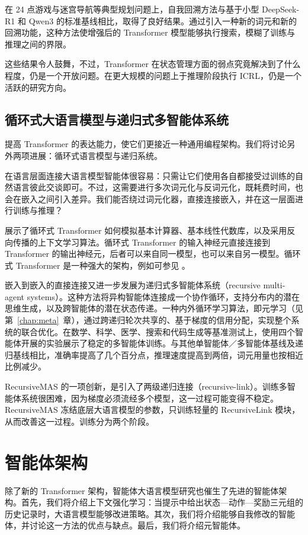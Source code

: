 在 24 点游戏与迷宫导航等典型规划问题上，自我回溯方法与基于小型 DeepSeek-R1 和 Qwen3 的标准基线相比，取得了良好结果。通过引入一种新的词元和新的回溯功能，这种方法使增强后的 Transformer 模型能够执行搜索，模糊了训练与推理之间的界限。

这些结果令人鼓舞，不过，Transformer 在状态管理方面的弱点究竟解决到了什么程度，仍是一个开放问题。在更大规模的问题上于推理阶段执行 ICRL，仍是一个活跃的研究方向。


\subsection{循环式大语言模型与递归式多智能体系统}
提高 Transformer 的表达能力，使它们更接近一种通用编程架构。我们将讨论另外两项进展：循环式语言模型与递归系统。

在语言层面连接大语言模型智能体很容易：只需让它们使用各自都接受过训练的自然语言彼此交谈即可。不过，这需要进行多次词元化与反词元化，既耗费时间，也会在嵌入之间引入差异。我们能否绕过词元化器，直接连接嵌入，并在这一层面进行训练与推理？


\citet{giannou2023looped} 展示了循环式 Transformer 如何模拟基本计算器、基本线性代数库，以及采用反向传播的上下文学习算法。循环式 Transformer 的输入神经元直接连接到 Transformer 的输出神经元，后者可以来自同一模型，也可以来自另一模型。循环式 Transformer 是一种强大的架构，例如可参见 \citet{yang2023looped,saunshi2025reasoning,zhu2025scaling}。

嵌入到嵌入的直接连接又进一步发展为递归式多智能体系统（recursive multi-agent systems）\citep{yang2026recursive}。这种方法将异构智能体连接成一个协作循环，支持分布内的潜在思维生成，以及跨智能体的潜在状态传递。一种内外循环学习算法，即元学习（见第~\ref{chap:meta}~章），通过跨递归轮次共享的、基于梯度的信用分配，实现整个系统的联合优化。在数学、科学、医学、搜索和代码生成等基准测试上，使用四个智能体开展的实验展示了稳定的多智能体训练。与其他单智能体／多智能体基线及递归基线相比，准确率提高了几个百分点，推理速度提高到两倍，词元用量也按相近比例减少。

RecursiveMAS 的一项创新，是引入了两级递归连接（recursive-link）。训练多智能体系统很困难，因为梯度必须流经多个模型，这一过程可能变得不稳定。RecursiveMAS 冻结底层大语言模型的参数，只训练轻量的 RecursiveLink 模块，从而改善这一过程。训练分为两个阶段。


\section{智能体架构}
除了新的 Transformer 架构，智能体大语言模型研究也催生了先进的智能体架构。首先，我们将介绍上下文强化学习：当提示中给出状态—动作—奖励三元组的历史记录时，大语言模型能够改进策略。其次，我们将介绍能够自我修改的智能体，并讨论这一方法的优点与缺点。最后，我们将介绍元智能体。




